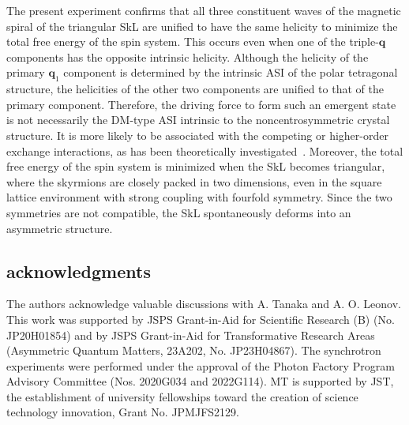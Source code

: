 \documentclass[aps,prb,reprint,superscriptaddress,amsmath,amssymb]{revtex4-2}
\begin{document}
The present experiment confirms that all three constituent waves of the magnetic spiral of the triangular SkL are unified to have the same helicity to minimize the total free energy of the spin system. This occurs even when one of the triple-$\bm{q}$ components has the opposite intrinsic helicity. 
Although the helicity of the primary $\bm{q}_1$ component is determined by the intrinsic ASI of the polar tetragonal structure, the helicities of the other two components are unified to that of the primary component. 
Therefore, the driving force to form such an emergent state is not necessarily the DM-type ASI intrinsic to the noncentrosymmetric crystal structure. 
It is more likely to be associated with the competing or higher-order exchange interactions, as has been theoretically investigated~\cite{Hayami17,Okubo12,Leonov15}. 
Moreover, the total free energy of the spin system is minimized when the SkL becomes triangular, where the skyrmions are closely packed in two dimensions, even in the square lattice environment with strong coupling with fourfold symmetry. 
Since the two symmetries are not compatible, the SkL spontaneously deforms into an asymmetric structure.  


\vspace{5mm}
\subsection*{acknowledgments}
The authors acknowledge valuable discussions with A. Tanaka and A. O. Leonov. 
This work was supported by JSPS Grant-in-Aid for Scientific Research (B) (No. JP20H01854) and by JSPS Grant-in-Aid for Transformative Research Areas (Asymmetric Quantum Matters, 23A202, No. JP23H04867). 
The synchrotron experiments were performed under the approval of the Photon Factory Program Advisory Committee (Nos. 2020G034 and 2022G114). 
MT is supported by JST, the establishment of university fellowships toward the creation of science technology innovation, Grant No. JPMJFS2129.



\end{document}
